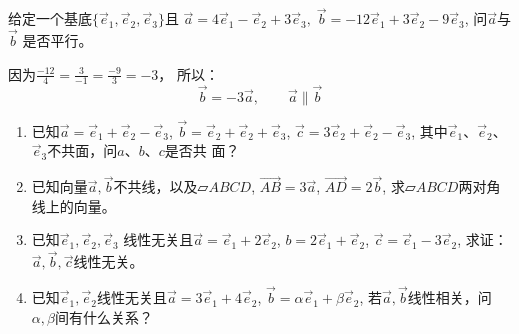\begin{example}
    给定一个基底$\{\vec{e}_1,\vec{e}_2,\vec{e}_3\}$且
$\vec{a}=4\vec{e}_1-\vec{e}_2+3\vec{e}_3,\; \vec{b}=-12\vec{e}_1+3\vec{e}_2-9\vec{e}_3$, 问$\vec{a}$与$\vec{b}$
是否平行。
\end{example}

\begin{solution}
因为$\frac{-12}{4}=\frac{3}{-1}=\frac{-9}{3}=-3$，
所以：
\[\vec{b}=-3\vec{a},\qquad \vec{a}\parallel \vec{b}\]    
\end{solution}

\begin{ex}
\begin{enumerate}
    \item 已知$\vec{a}=\vec{e}_1+\vec{e}_2-\vec{e}_3$, $\vec{b}=\vec{e}_2+\vec{e}_2+\vec{e}_3$, $\vec{c} =3\vec{e}_2+\vec{e}_2-\vec{e}_3$, 其中$\vec{e}_1$、$\vec{e}_2$、$\vec{e}_3$不共面，问$a$、$b$、$c$是否共
    面？
    \item     已知向量$\vec{a},\vec{b}$不共线，以及$\parallelogram ABCD$, $\Vec{AB}=3\vec{a}$, $\Vec{AD}=2\vec{b}$, 求$\parallelogram ABCD$两对角线上的向量。
  \item 已知$\vec{e}_1,\vec{e}_2,\vec{e}_3$
    线性无关且$\vec{a}=\vec{e}_1+2\vec{e}_2$, $b=2\vec{e}_1+\vec{e}_2$, 
    $\vec{c}=\vec{e}_1-3\vec{e}_2$, 求证：$\vec{a},\vec{b},\vec{c}$线性无关。
    \item  已知$\vec{e}_1,\vec{e}_2$线性无关且$\vec{a}=3\vec{e}_1+4\vec{e}_2$, $\vec{b}=\alpha\vec{e}_1+\beta \vec{e}_2$, 若$\vec{a}, \vec{b}$线性相关，问$\alpha,\beta$间有什么关系？
    

\end{enumerate}
\end{ex}
